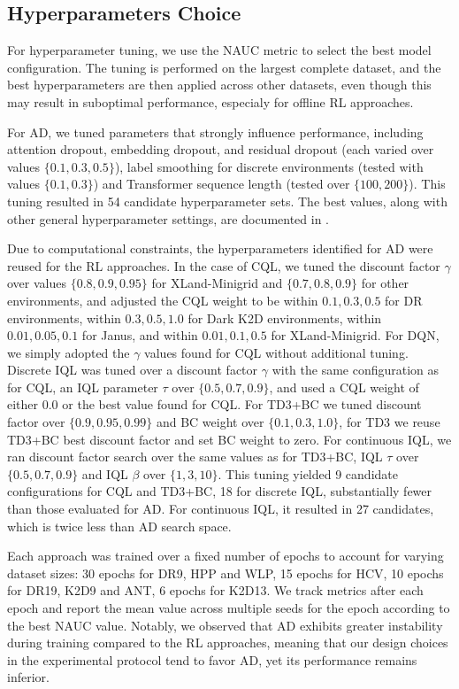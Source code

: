 \documentclass{article} %
\begin{document}
\subsection{Hyperparameters Choice}
For hyperparameter tuning, we use the NAUC metric to select the best model configuration. The tuning is performed on the largest complete dataset, and the best hyperparameters are then applied across other datasets, even though this may result in suboptimal performance, especialy for offline RL approaches.

For AD, we tuned parameters that strongly influence performance, including attention dropout, embedding dropout, and residual dropout (each varied over values $\{0.1, 0.3, 0.5\}$), label smoothing for discrete environments (tested with values $\{0.1, 0.3\}$) and Transformer sequence length (tested over $\{100, 200\}$). This tuning resulted in 54 candidate hyperparameter sets. The best values, along with other general hyperparameter settings, are documented in .

Due to computational constraints, the hyperparameters identified for AD were reused for the RL approaches. In the case of CQL, we tuned the discount factor $\gamma$ over values $\{0.8, 0.9, 0.95\}$ for XLand-Minigrid and $\{0.7, 0.8, 0.9\}$ for other environments, and adjusted the CQL weight to be within ${0.1, 0.3, 0.5}$ for DR environments, within ${0.3, 0.5, 1.0}$ for Dark K2D environments, within ${0.01, 0.05, 0.1}$ for Janus, and within ${0.01, 0.1, 0.5}$ for XLand-Minigrid. For DQN, we simply adopted the $\gamma$ values found for CQL without additional tuning. Discrete IQL was tuned over a discount factor $\gamma$ with the same configuration as for CQL, an IQL parameter $\tau$ over $\{0.5, 0.7, 0.9\}$, and used a CQL weight of either $0.0$ or the best value found for CQL. For TD3+BC we tuned discount factor over $\{0.9, 0.95, 0.99\}$ and BC weight over $\{0.1, 0.3, 1.0\}$, for TD3 we reuse TD3+BC best discount factor and set BC weight to zero. For continuous IQL, we ran discount factor search over the same values as for TD3+BC, IQL $\tau$ over $\{0.5, 0.7, 0.9\}$ and IQL $\beta$ over $\{1, 3, 10\}$. This tuning yielded 9 candidate configurations for CQL and TD3+BC, 18 for discrete IQL, substantially fewer than those evaluated for AD. For continuous IQL, it resulted in 27 candidates, which is twice less than AD search space.
 
Each approach was trained over a fixed number of epochs to account for varying dataset sizes: 30 epochs for DR9, HPP and WLP, 15 epochs for HCV, 10 epochs for DR19, K2D9 and ANT, 6 epochs for K2D13. We track metrics after each epoch and report the mean value across multiple seeds for the epoch according to the best NAUC value. Notably, we observed that AD exhibits greater instability during training compared to the RL approaches, meaning that our design choices in the experimental protocol tend to favor AD, yet its performance remains inferior.
\end{document}
